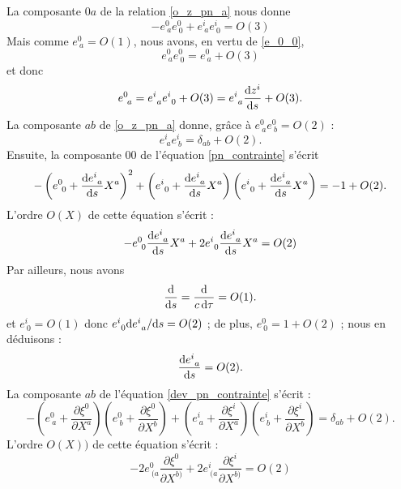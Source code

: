 			La composante $0a$ de la relation \ref{o_z_pn_a} nous donne
			\begin{equation}
				-e^0_{\ a}e^0_{\ 0}+e^i_{\ a}e^i_{\ 0}=O(3)
			\end{equation}
			Mais comme $e^0_{\ a}=O(1)$, nous avons, en vertu de \ref{e_0_0},
			\begin{equation}
				e^0_{\ a}e^0_{\ 0}=e^0_{\ a}+O(3)
			\end{equation}
			et donc
			\begin{equation}
				e^0_{\ a}=e^i_{\ a}e^i_{\ 0}+O(3)=e^i_{\ a}\frac{\d z^i}{\d s} + O(3).
			\end{equation}
			La composante $ab$ de \ref{o_z_pn_a} donne, grâce à $e^0_{\ a}e^0_{\ b}=O(2)$ :
			\begin{equation}
				e^i_{\ a}e^i_{\ b}=\delta_{ab}+O(2). \label{rotation_ab}
			\end{equation}
			Ensuite, la composante $00$ de l'équation  \ref{pn_contrainte} s'écrit
			\begin{equation}\label{dev_pn_contrainte}
				-\left(e^0_{\ 0}+ \frac{\mathrm{d} e^i_{\ a}}{\mathrm{d} s} X^a \right)^2 + \left( e^i_{\ 0} + \frac{\mathrm{d} e^i_{\ a}}{\mathrm{d} s} X^a \right)\left( e^i_{\ 0} + \frac{\mathrm{d} e^i_{\ a}}{\mathrm{d} s} X^a \right)=-1+O(2).
			\end{equation}
			L'ordre $O(X)$ de cette équation s'écrit :
			\begin{equation}
				-e^0_{\ 0}\frac{\d e^i_{\ a}}{\d s}X^ a+ 2 e^i_{\ 0}\frac{\d e^i_{\ a}}{\d s}X^a=O(2)
			\end{equation}
			Par ailleurs, nous avons
			\begin{equation}
				\frac{\mathrm{d}}{\mathrm{d} s}=\frac{\mathrm{d}}{c\, \mathrm{d} \tau}=O(1).
			\end{equation}
			et $e^i_{\ 0}=O(1)$ donc $e^i_{\ 0}\mathrm{d} e^i_{\ a}/\mathrm{d} s=O(2)$ ; de plus, $e^0_{\ 0}=1+O(2)$ ; nous en déduisons :
			\begin{equation}
				\frac{\d e^i_{\ a}}{\d s}=O(2).
			\end{equation}
			La composante $ab$ de l'équation \ref{dev_pn_contrainte} s'écrit :
			\begin{equation}
				-\left(e^0_{\ a}+\frac{\partial \xi^0}{\partial X^a}\right)\left(e^0_{\ b}+\frac{\partial \xi^0}{\partial X^b}\right)
				+\left( e^i_{\ a} + \frac{\partial \xi^i}{\partial X^a} \right)\left( e^i_{\ b} + \frac{\partial \xi^i}{\partial X^b} \right)
				=\delta_{ab}+O(2).
			\end{equation}
			L'ordre $O(X))$ de cette équation s'écrit :
			\begin{equation}\label{o_1_pn_ab}
				-2e^0_{\ (a}\frac{\partial \xi^0}{\partial X^{b)}}+2e^i_{\ (a}\frac{\partial \xi^i}{\partial X^{b)}}=O(2)
			\end{equation}
